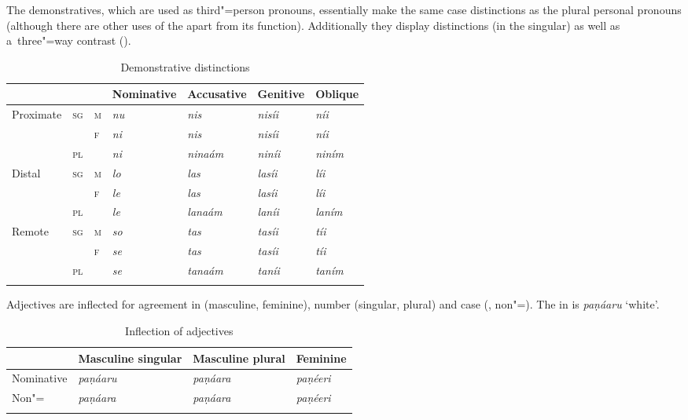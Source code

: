 The demonstratives, which are used as third"=person pronouns, essentially make the same case distinctions as the plural personal pronouns (although there are other uses of the  apart from its  function). Additionally they display  distinctions (in the  singular) as well as a~three"=way  contrast ().


\begin{table}[ht]
\caption{Demonstrative distinctions}
\begin{tabularx}{\textwidth}{ l l l Q Q Q Q }
\lsptoprule
&
&
&
Nominative &
Accusative &
Genitive &
Oblique \\\hline
Proximate &
\textsc{sg} &
\textsc{m} &
\textit{nu} &
\textit{nis} &
\textit{nisíi} &
\textit{níi} \\
&
&
\textsc{f} &
\textit{ni} &
\textit{nis} &
\textit{nisíi} &
\textit{níi} \\
&
\textsc{pl} &
&
\textit{ni} &
\textit{ninaám} &
\textit{niníi} &
\textit{niním} \\
Distal &
\textsc{sg} &
\textsc{m} &
\textit{lo} &
\textit{las} &
\textit{lasíi} &
\textit{líi} \\
&
&
\textsc{f} &
\textit{le} &
\textit{las} &
\textit{lasíi} &
\textit{líi} \\
&
\textsc{pl} &
&
\textit{le} &
\textit{lanaám} &
\textit{laníi} &
\textit{laním} \\
Remote &
\textsc{sg} &
\textsc{m} &
\textit{so} &
\textit{tas} &
\textit{tasíi} &
\textit{tíi} \\
&
&
\textsc{f} &
\textit{se} &
\textit{tas} &
\textit{tasíi} &
\textit{tíi} \\
&
\textsc{pl} &
&
\textit{se} &
\textit{tanaám} &
\textit{taníi} &
\textit{taním} \\\lspbottomrule
\end{tabularx}
\label{tab:2-dem}
\end{table}


Adjectives are inflected for agreement in  (masculine, feminine), number (singular, plural) and case (, non"=). The  in  is \textit{paṇáaru} `white'.


\begin{table}[ht]
\caption{Inflection of adjectives}
\begin{tabularx}{\textwidth}{ l l l Q }
\lsptoprule
&
Masculine singular &
Masculine plural &
Feminine\\\hline
Nominative &
\textit{paṇáaru} &
\textit{paṇáara} &
\textit{paṇéeri} \\
Non"= &
\textit{paṇáara} &
\textit{paṇáara} &
\textit{paṇéeri} \\\lspbottomrule
\end{tabularx}
\label{tab:2-adj}
\end{table}


